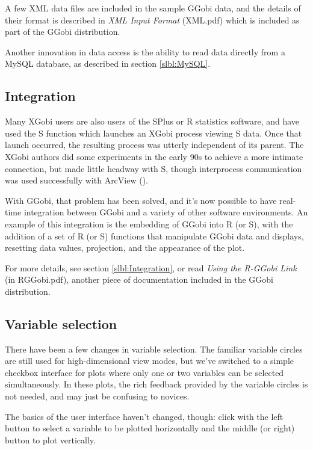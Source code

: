 \documentclass[11pt]{article}
\begin{document}
A few XML data files are included in the sample GGobi data, and
the details of their format is described in {\em XML Input Format}
(XML.pdf) which is included as part of the GGobi distribution.

Another innovation in data access is the ability to read data
directly from a MySQL database, as described in section \ref{slbl:MySQL}.

\subsection{Integration}

Many XGobi users are also users of the SPlus or R statistics software, and
have used the S function which launches an XGobi process viewing S data.
Once that launch occurred, the resulting process was utterly independent
of its parent.  The XGobi authors did some experiments in the early 90s
to achieve a more intimate connection, but made little headway with S,
though interprocess communication was used successfully with ArcView
(\cite{SwayneBujaHubbell91,SMCM97}).

With GGobi, that problem has been solved, and it's now possible
to have real-time integration between GGobi and a variety of
other software environments.  An example of this integration is
the embedding of GGobi into R (or S), with the addition of a set of
R (or S) functions that manipulate GGobi data and displays,
resetting data values, projection, and the appearance of the plot.

For more details, see section \ref{slbl:Integration}, or read
{\em Using the R-GGobi Link} (in RGGobi.pdf), another piece of
documentation included in the GGobi distribution.

\subsection {Variable selection}

There have been a few changes in variable selection.  The familiar
variable circles are still used for high-dimensional view modes, but
we've switched to a simple checkbox interface for plots where only one
or two variables can be selected simultaneously.  In these plots, the
rich feedback provided by the variable circles is not needed, and may
just be confusing to novices.

The basics of the user interface haven't changed, though:
click with the left button to select a variable to be plotted
horizontally and the middle (or right) button to plot vertically.
\end{document}
